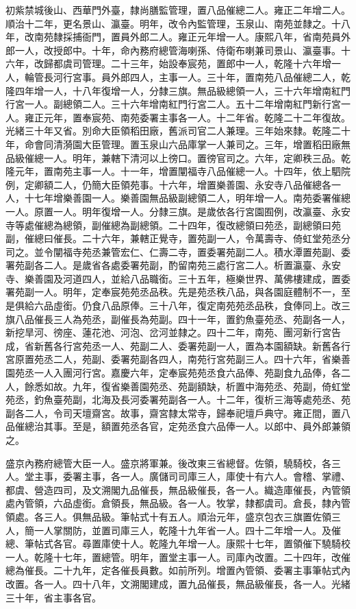 \begin{pinyinscope}
初紫禁城後山、西華門外臺，隸尚膳監管理，置八品催總二人。雍正二年增二人。順治十二年，更名景山、瀛臺。明年，改令內監管理，玉泉山、南苑並隸之。十八年，改南苑隸採捕衙門，置員外郎二人。雍正元年增一人。康熙八年，省南苑員外郎一人，改授郎中。十年，命內務府總管海喇孫、侍衛布喇兼司景山、瀛臺事。十六年，改歸都虞司管理。二十三年，始設奉宸苑，置郎中一人，乾隆十六年增一人，輪管長河行宮事。員外郎四人，主事一人。三十年，置南苑八品催總二人，乾隆四年增一人，十八年復增一人，分隸三旗。無品級總領一人，三十六年增南紅門行宮一人。副總領二人。三十六年增南紅門行宮二人。五十二年增南紅門新行宮一人。雍正元年，置奉宸苑、南苑委署主事各一人。十二年省。乾隆二十二年復故。光緒三十年又省。別命大臣領稻田廠，舊派司官二人兼理。三年始來隸。乾隆二十年，命會同清漪園大臣管理。置玉泉山六品庫掌一人兼司之。三年，增置稻田廠無品級催總一人。明年，兼轄下清河以上徬口。置徬官司之。六年，定卿秩三品。乾隆元年，置南苑主事一人。十一年，增置闡福寺八品催總一人。十四年，依上駟院例，定卿額二人，仍簡大臣領苑事。十六年，增置樂善園、永安寺八品催總各一人，十七年增樂善園一人。樂善園無品級副總領二人，明年增一人。南苑委署催總一人。原置一人。明年復增一人。分隸三旗。是歲依各行宮園囿例，改瀛臺、永安寺等處催總為總領，副催總為副總領。二十四年，復改總領曰苑丞，副總領曰苑副，催總曰催長。二十六年，兼轄正覺寺，置苑副一人，令萬壽寺、倚虹堂苑丞分司之。並令闡福寺苑丞兼管宏仁、仁壽二寺，置委署苑副二人。積水潭置苑副、委署苑副各二人。是歲省各處委署苑副，酌留南苑三處行宮二人。析置瀛臺、永安寺、樂善園及河道四人，並給八品職銜。三十五年，極樂世界、萬佛樓建成，置委署苑副一人。明年，定奉宸苑苑丞品秩。先是苑丞秩八品，與各園庭體制不一，至是俱給六品虛銜。仍食八品原俸。三十八年，復定南苑苑丞品秩，食俸同上。改三旗八品催長三人為苑丞，副催長為苑副。四十一年，置釣魚臺苑丞、苑副各一人，新挖旱河、徬座、蓮花池、河泡、岔河並隸之。四十二年，南苑、團河新行宮告成，省新舊各行宮苑丞一人、苑副二人、委署苑副一人，置為本園額缺。新舊各行宮原置苑丞二人，苑副、委署苑副各四人，南苑行宮苑副三人。四十六年，省樂善園苑丞一人入團河行宮。嘉慶六年，定奉宸苑苑丞食六品俸、苑副食九品俸，各二人，餘悉如故。九年，復省樂善園苑丞、苑副額缺，析置中海苑丞、苑副，倚虹堂苑丞，釣魚臺苑副，北海及長河委署苑副各一人。十二年，復析三海等處苑丞、苑副各二人，令司天壇齋宮。故事，齋宮隸太常寺，歸奉祀壇戶典守。雍正間，置八品催總治其事。至是，額置苑丞各官，定苑丞食六品俸一人。以郎中、員外郎兼領之。

盛京內務府總管大臣一人。盛京將軍兼。後改東三省總督。佐領，驍騎校，各三人。堂主事，委署主事，各一人。廣儲司司庫三人，庫使十有六人。會稽、掌禮、都虞、營造四司，及文溯閣九品催長，無品級催長，各一人。織造庫催長，內管領處內管領，六品虛銜。倉領長，無品級。各一人。牧掌，隸都虞司。倉長，隸內管領處。各三人。俱無品級。筆帖式十有五人。順治元年，盛京包衣三旗置佐領三人，簡一人掌關防，並置司庫三人，乾隆十九年省一人。四十二年增一人。及催總、筆帖式各官。尋置庫使十人。乾隆九年增一人。康熙十七年，置領催下驍騎校一人。乾隆十七年，置總管。明年，置堂主事一人。司庫內改置。二十四年，改催總為催長。二十九年，定各催長員數。如前所列。增置內管領、委署主事筆帖式內改置。各一人。四十八年，文溯閣建成，置九品催長，無品級催長，各一人。光緒三十年，省主事各官。


\end{pinyinscope}
